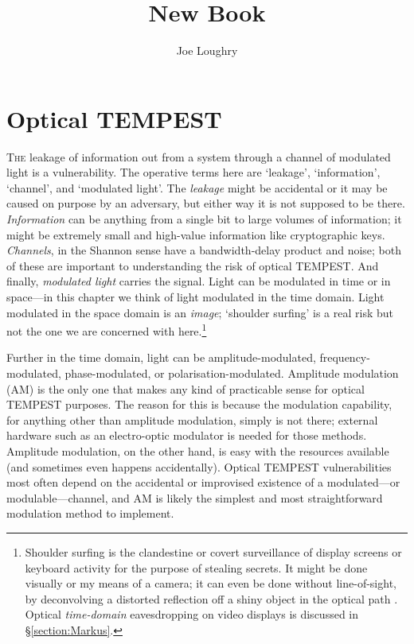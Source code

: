 \documentclass[a4paper,twoside,11pt]{book}
\begin{document}
\title{New Book}
\author{Joe Loughry}
\setcounter{chapter}{6} %
\setcounter{page}{262} %
\thispagestyle{empty}
\chapter{Optical TEMPEST}
\lettrine[lines=3]{T}{he} leakage of information out from a system through a
channel of modulated light is a vulnerability. The operative terms here are
`leakage',
`information', `channel', and `modulated light'. The \emph{leakage} might be
accidental or it may be caused on purpose by an adversary, but either way it
is not
supposed to be there. \emph{Information} can be anything from a single bit to
large volumes of information; it might be extremely small and high-value
information like
cryptographic keys. \emph{Channels}, in the Shannon sense \cite{Shannon1948}
have a bandwidth-delay product and noise; both of these are important to
understanding the risk of optical TEMPEST. And finally, \emph{modulated light}
carries the signal. Light can be modulated in time or in space---in this
chapter we think of
light modulated in the time domain. Light modulated in the space domain is an
\emph{image}; `shoulder surfing' is a real risk but not the one we are
concerned with here.\footnote{Shoulder surfing is the clandestine or covert
surveillance of display screens or keyboard activity for the purpose of
stealing secrets. It might be done visually or my means of a camera; it can
even be done without line-of-sight, by deconvolving a distorted reflection off
a shiny object in the optical path
\cite{Backes2008,Backes2009a,Raguram2011,Jenkins2013a,Xu2013a}. Optical
\emph{time-domain} eavesdropping on video displays \cite{Kuhn2002} is discussed
in \S \ref{section:Markus}.}

Further in the time domain, light can be amplitude-modulated,
frequency-modulated, phase-modulated, or polarisation-modulated. Amplitude
modulation (AM) is the only one that makes any kind of practicable sense for
optical TEMPEST purposes. The reason for this is because the modulation
capability, for anything other than amplitude modulation, simply is not there;
external hardware such as an electro-optic modulator is needed for those
methods. Amplitude modulation, on the other hand, is easy with the resources
available (and sometimes even happens accidentally). Optical TEMPEST
vulnerabilities most often depend on the accidental or improvised existence of
a modulated---or modulable---channel, and AM is likely the simplest and most
straightforward modulation method to implement.
\end{document}
